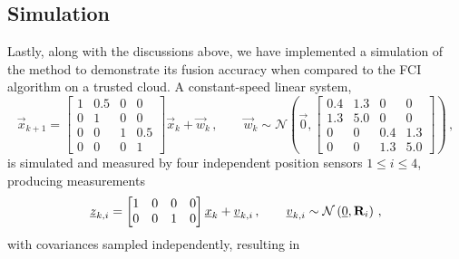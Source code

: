 % 
% 

\subsection{Simulation}\label{subsec:cloud_fusion:secfci_simulation}
Lastly, along with the discussions above, we have implemented a simulation of the method to demonstrate its fusion accuracy when compared to the FCI algorithm on a trusted cloud. A constant-speed linear system, 
\begin{equation}\label{eq:cloud_fusion:secfci_system_model}
    \vec{x}_{k+1} = 
    \begin{bmatrix}
        1 & 0.5 & 0 & 0\\
        0 & 1 & 0 & 0\\
        0 & 0 & 1 & 0.5\\
        0 & 0 & 0 & 1
    \end{bmatrix}\vec{x}_k + \vec{w}_k\,,\qquad \vec{w}_k\sim\mathcal{N}\left(\vec{0},
    \begin{bmatrix}
        0.4 & 1.3 & 0 & 0\\
        1.3 & 5.0 & 0 & 0\\
        0 & 0 & 0.4 & 1.3\\
        0 & 0 & 1.3 & 5.0
    \end{bmatrix}
    \right)\,,
\end{equation}
is simulated and measured by four independent position sensors $1\leq i\leq 4$, producing measurements 
\begin{equation}\label{eq:cloud_fusion:secfci_measurement_model}
    {\underline{z}}_{k,i} = 
    \begin{bmatrix}
        1 & 0 & 0 & 0\\
        0 & 0 & 1 & 0
     \end{bmatrix}{\underline{x}}_k + {\underline{v}}_{k,i}\,,\qquad {\underline{v}}_{k,i}\sim\mathcal{N}\left({\underline{0}},{{\mathbf{R}}}_i\right)\,,
\end{equation}
with covariances sampled independently, resulting in
